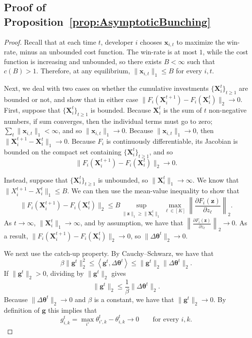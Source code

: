 \subsection{Proof of Proposition~\ref{prop:AsymptoticBunching}}
\label{app:AsymptoticBunching}
\AsymptoticBunching*

\begin{proof}
Recall that at each time $t$, developer $i$ chooses $\mathbf x_{i,t}$ to maximize the win-rate, minus an unbounded cost function.
The win-rate is at most $1$, while the cost function is increasing and unbounded, so there exists $B<\infty$ such that $c(B)>1$. 
Therefore, at any equilibrium, $\|\mathbf x_{i,t}\|_1\le B$ for every $i,t$. 

Next, we deal with two cases on whether the cumulative investments $\{\mathbf X_i^t\}_{t\ge1}$ are bounded or not, and show that in either case $\|F_i(\mathbf X_i^{t+1})-F_i(\mathbf X_i^t)\|_2 \to 0$.  
First, suppose that $\{\mathbf X_i^t\}_{t\ge1}$ is bounded. 
Because $\mathbf X_i^t$ is the sum of $t$ non-negative numbers, if sum converges, then the individual terms must go to zero; $\sum_t\|\mathbf x_{i,t}\|_1<\infty$, and so $\|\mathbf x_{i,t}\|_1\to0$.
Because $\|\mathbf x_{i,t}\|_1\to0$, then $\lVert \mathbf X_i^{t+1}-\mathbf X_i^t \rVert_1 \to 0$. 
Because $F_i$ is continuously differentiable, its Jacobian is bounded on the compact set containing $\{\mathbf X_i^t\}_{t\ge1}$, and so 
\[
\|F_i(\mathbf X_i^{t+1})-F_i(\mathbf X_i^t)\|_2
\to0.
\]

Instead, suppose that $\{\mathbf X_i^t\}_{t\ge1}$ is unbounded, so  $\|\mathbf X_i^t\|_1\to\infty$.
We know that $\lVert X_i^{t+1}-X_i^{t} \rVert_1 \leq B$.
We can then use the mean-value inequality to show that 
\[
\|F_i(\mathbf X_i^{t+1})-F_i(\mathbf X_i^t)\|_2
\le
B
\sup_{\|\mathbf z\|_1\ge\|\mathbf X_i^t\|_1}
\max_{\ell\in[K]}
\left\|
\frac{\partial F_i(\mathbf z)}{\partial z_\ell}
\right\|_2 .
\]
As $t\to\infty$, $\|\mathbf X_i^t\|_1\to\infty$, and by assumption, we have that $\left\|
\frac{\partial F_i(\mathbf z)}{\partial z_\ell}
\right\|_2 \to 0$.
As a result, $\|F_i(\mathbf X_i^{t+1})-F_i(\mathbf X_i^t)\|_2 \to 0$, so $\|\Delta\boldsymbol{\theta}^t\|_2\to0$.

We next use the catch-up property. 
By Cauchy--Schwarz, we have that 
\[
\beta\|\mathbf g^t\|_2^2
\le
\left\langle
\mathbf g^t,\Delta\boldsymbol{\theta}^t
\right\rangle
\le
\|\mathbf g^t\|_2
\|\Delta\boldsymbol{\theta}^t\|_2.
\]
If $\|\mathbf g^t\|_2>0$, dividing by $\|\mathbf g^t\|_2$ gives
\[
\|\mathbf g^t\|_2
\le
\frac{1}{\beta}
\|\Delta\boldsymbol{\theta}^t\|_2.
\]
Because $\|\Delta\boldsymbol{\theta}^t\|_2 \to 0$ and $\beta$ is a constant, we have that $\lVert \mathbf{g}^t \rVert_2\to 0$. 
By definition of $\mathbf{g}$ this implies that 
\[
g_{i,k}^t
=
\max_{i'}\theta_{i',k}^t-\theta_{i,k}^t
\to0
\qquad\text{for every }i,k.
\]
\end{proof}

